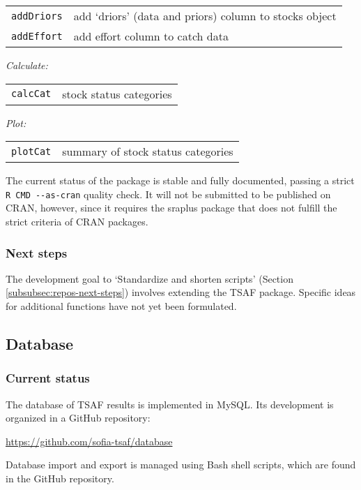 \documentclass[12pt]{article}
\newcommand\blue[1]{\textcolor{darkblue}{#1}}
\begin{document}
\begin{tabular}{ll}
  {\tt addDriors} & add `driors' (data and priors) column to stocks object\\
  {\tt addEffort} & add effort column to catch data\\[1.5ex]
\end{tabular}

{\it Calculate:}

\begin{tabular}{ll}
  {\tt calcCat} & stock status categories\\[1.5ex]
\end{tabular}

{\it Plot:}

\begin{tabular}{ll}
  {\tt plotCat} & summary of stock status categories\\[1.5ex]
\end{tabular}

The current status of the package is stable and fully documented, passing a
strict \verb|R CMD --as-cran| quality check. It will not be submitted to be
published on CRAN, however, since it requires the {\sf sraplus} package that
does not fulfill the strict criteria of CRAN packages.

\subsubsection{Next steps}

The development goal to `Standardize and shorten scripts' (Section
\ref{subsubsec:repos-next-steps}) involves extending the {\sf TSAF} package.
Specific ideas for additional functions have not yet been formulated.

\subsection{Database}

\subsubsection{Current status}

The database of TSAF results is implemented in MySQL. Its development is
organized in a GitHub repository:

\qquad\blue{\url{https://github.com/sofia-tsaf/database}}

Database import and export is managed using Bash shell scripts, which are found
in the GitHub repository.
\end{document}
